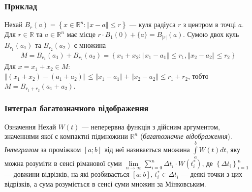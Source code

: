 \documentclass[10pt,pdf]{beamer}
\newcommand{\R}{\mathbb{R}}
\renewcommand{\l}{\left}
\renewcommand{\r}{\right}
\newcommand{\norm}[1]{\left\Vert #1 \right\Vert}
\newcommand{\intl}{\int\limits}
\newcommand{\suml}{\sum\limits}
\begin{document}
    \begin{frame}
        \frametitle{Приклад}
    
        Нехай $B_{r}(a) = \l\{x \in \R^n : \norm{x - a} \leq r \r\}$ --- куля
        радіуса $r$ з центром в точці $a$. Для
        $r \in \R$ та $a \in \R^n$ має місце
        $r\cdot B_{1}(0) + \{a\} = B_{|r|}(a)$.
        Сумою двох куль $B_{r_1}(a_1)$ та $B_{r_2}(a_2)$ є множина
        \begin{gather*}
            M = B_{r_1}(a_1) + B_{r_2}(a_2) = \l\{ 
                x_1 + x_2 : \norm{x_1 - a_1} \leq r_1, \norm{x_2 - a_2} \leq r_2    
            \r\}
        \end{gather*}
        Для $x = x_1 + x_2 \in M$: $\norm{(x_1 + x_2) - (a_1 + a_2)} \leq \norm{x_1 - a_1} + \norm{x_2 - a_2} \leq r_1 + r_2$,
        тобто $M = B_{r_1 + r_2}(a_1 + a_2)$.
        \begin{center}
        \end{center}
    
    \end{frame}
    \begin{frame}
        \frametitle{Інтеграл багатозначного відображення}
    
        \begin{block}{Означення}
            Нехай $W(t)$ --- неперервна функція з дійсним аргументом, значеннями якої
        є компактні підмножини $\R^n$ (\emph{багатозначне відображення}).
        \emph{Інтегралом} за проміжком $[a;b]$ від неї називається множина
        $\intl_a^b W(t) dt$, яку можна розуміти в сенсі ріманової суми
        $\underset{n\to\infty}{\lim} \suml_{i=0}^n \Delta t_i\cdot W(t_i^*)$,
        де $\l\{\Delta t_i\r\}_{i=1}^n$ --- довжини відрізків, на які розбивається $[a;b]$, $t_i^* \in \Delta t_i$ ---
        деякі точки з цих відрізків, а сума розуміється в сенсі суми множин за Мінковським.
            \end{block}
    
    \end{frame}
\end{document}
